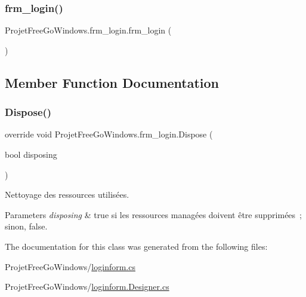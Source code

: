 \subsubsection{\texorpdfstring{frm\+\_\+login()}{frm\_login()}}
{\footnotesize\ttfamily Projet\+Free\+Go\+Windows.\+frm\+\_\+login.\+frm\+\_\+login (\begin{DoxyParamCaption}{ }\end{DoxyParamCaption})}



\subsection{Member Function Documentation}
\mbox{\label{class_projet_free_go_windows_1_1frm__login_a18f64767d510f8d6227ecb61675a2569}} 
\subsubsection{\texorpdfstring{Dispose()}{Dispose()}}
{\footnotesize\ttfamily override void Projet\+Free\+Go\+Windows.\+frm\+\_\+login.\+Dispose (\begin{DoxyParamCaption}\item[{bool}]{disposing }\end{DoxyParamCaption})\hspace{0.3cm}{\ttfamily [protected]}}



Nettoyage des ressources utilisées. 


\begin{DoxyParams}{Parameters}
{\em disposing} & true si les ressources managées doivent être supprimées ; sinon, false.\\
\hline
\end{DoxyParams}


The documentation for this class was generated from the following files\+:\begin{DoxyCompactItemize}
\item 
Projet\+Free\+Go\+Windows/\hyperlink{loginform_8cs}{loginform.\+cs}\item 
Projet\+Free\+Go\+Windows/\hyperlink{loginform_8_designer_8cs}{loginform.\+Designer.\+cs}\end{DoxyCompactItemize}
